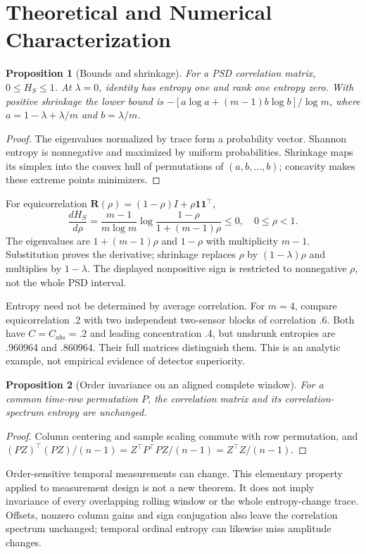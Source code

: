 \documentclass[conference]{IEEEtran}
\newtheorem{proposition}{Proposition}
\newcommand{\R}{\mathbf R}
\begin{document}
\section{Theoretical and Numerical Characterization}
\begin{proposition}[Bounds and shrinkage]
For a PSD correlation matrix, $0\leq H_S\leq1$. At $\lambda=0$, identity
has entropy one and rank one entropy zero. With positive shrinkage the lower
bound is $-[a\log a+(m-1)b\log b]/\log m$, where
$a=1-\lambda+\lambda/m$ and $b=\lambda/m$.
\end{proposition}
\begin{proof}
The eigenvalues normalized by trace form a probability vector. Shannon
entropy is nonnegative and maximized by uniform probabilities. Shrinkage maps
its simplex into the convex hull of permutations of $(a,b,\ldots,b)$;
concavity makes these extreme points minimizers.\end{proof}

For equicorrelation $\R(\rho)=(1-\rho)I+\rho\mathbf1\mathbf1^\top$,
\begin{equation}
\frac{dH_S}{d\rho}=\frac{m-1}{m\log m}
\log\frac{1-\rho}{1+(m-1)\rho}\leq0,\quad 0\leq\rho<1.
\end{equation}
The eigenvalues are $1+(m-1)\rho$ and $1-\rho$ with multiplicity $m-1$.
Substitution proves the derivative; shrinkage replaces $\rho$ by
$(1-\lambda)\rho$ and multiplies by $1-\lambda$. The displayed nonpositive
sign is restricted to nonnegative $\rho$, not the whole PSD interval.

Entropy need not be determined by average correlation. For $m=4$, compare
equicorrelation .2 with two independent two-sensor blocks of correlation .6.
Both have $C=C_{abs}=.2$ and leading concentration .4, but unshrunk entropies
are .960964 and .860964. Their full matrices distinguish them. This is an
analytic example, not empirical evidence of detector superiority.

\begin{proposition}[Order invariance on an aligned complete window]
For a common time-row permutation $P$, the correlation matrix and its
correlation-spectrum entropy are unchanged.
\end{proposition}
\begin{proof}
Column centering and sample scaling commute with row permutation, and
$(PZ)^\top(PZ)/(n-1)=Z^\top P^\top PZ/(n-1)=Z^\top Z/(n-1)$.
\end{proof}
Order-sensitive temporal measurements can change. This elementary property
applied to measurement design is not a new theorem. It does not imply invariance
of every overlapping rolling window or the whole entropy-change trace. Offsets,
nonzero column gains and sign conjugation also leave the correlation spectrum
unchanged; temporal ordinal entropy can likewise miss amplitude changes.
\end{document}
